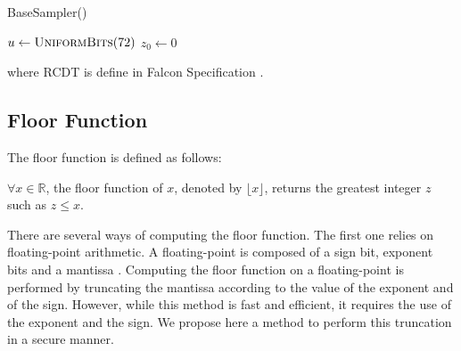 \documentclass[runningheads]{llncs}
\begin{document}
\bigskip




\begin{algorithm}[H]
  \caption{BaseSampler() \cite{prest2020falcon}}
  \KwData{--}
  \small
$u \leftarrow \textsc{UniformBits}(72)$\;
  $z_0 \leftarrow 0$\;
\;
\end{algorithm}

\noindent where RCDT is define in Falcon Specification \cite{prest2020falcon}.

\subsection{Floor Function}\label{subsec:floorfunction}
The floor function is defined as follows:
\begin{definition}\label{def:floorfunction}
  $\forall x \in \mathbb{R}$, the floor function of $x$, denoted by $\lfloor x \rfloor$, returns the greatest integer $z$ such as $z\leq x$.
\end{definition}
There are several ways of computing the floor function. The first one
relies on floating-point arithmetic. A floating-point is composed of a
sign bit, exponent bits and a mantissa \cite{kahan1996ieee}. Computing
the floor function on a floating-point is performed by truncating the
mantissa according to the value of the exponent and of the
sign. However, while this method is fast and efficient, it requires
the use of the exponent and the sign. We propose here a method to
perform this truncation in a secure manner.

\medskip
\end{document}
